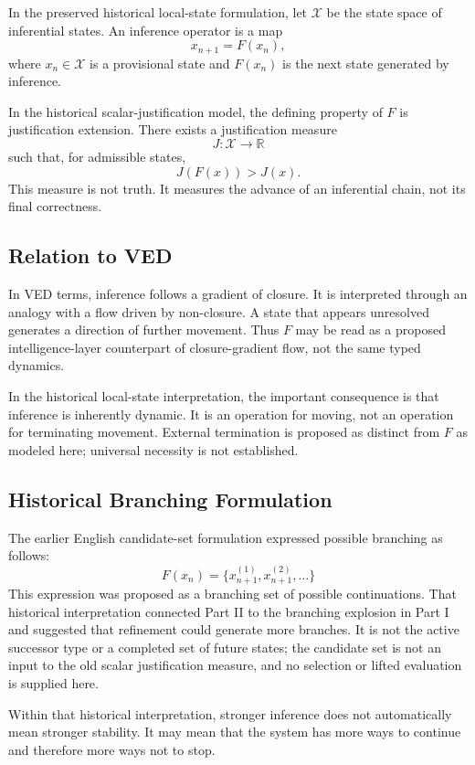 In the preserved historical local-state formulation, let $\mathcal{X}$ be the state space of inferential states. An inference operator is a map
\[
x_{n+1}=F(x_n),
\]
where $x_n\in\mathcal{X}$ is a provisional state and $F(x_n)$ is the next state generated by inference.

In the historical scalar-justification model, the defining property of $F$ is justification extension. There exists a justification measure
\[
J:\mathcal{X}\to\mathbb{R}
\]
such that, for admissible states,
\[
J(F(x))>J(x).
\]
This measure is not truth. It measures the advance of an inferential chain, not its final correctness.

\subsection{Relation to VED}

In VED terms, inference follows a gradient of closure. It is interpreted through an analogy with a flow driven by non-closure. A state that appears unresolved generates a direction of further movement. Thus $F$ may be read as a proposed intelligence-layer counterpart of closure-gradient flow, not the same typed dynamics.

In the historical local-state interpretation, the important consequence is that inference is inherently dynamic. It is an operation for moving, not an operation for terminating movement. External termination is proposed as distinct from $F$ as modeled here; universal necessity is not established.

\subsection{Historical Branching Formulation}

The earlier English candidate-set formulation expressed possible branching as follows:
\[
F(x_n)=\{x_{n+1}^{(1)},x_{n+1}^{(2)},\ldots\}
\]
This expression was proposed as a branching set of possible continuations. That historical interpretation connected Part II to the branching explosion in Part I and suggested that refinement could generate more branches. It is not the active successor type or a completed set of future states; the candidate set is not an input to the old scalar justification measure, and no selection or lifted evaluation is supplied here.

Within that historical interpretation, stronger inference does not automatically mean stronger stability. It may mean that the system has more ways to continue and therefore more ways not to stop.

